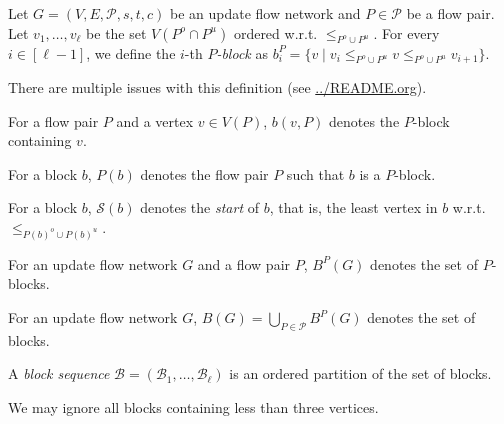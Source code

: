 \documentclass[fontsize=11pt,paper=a4]{book}
\begin{document}
\begin{defn}
Let \(G=(V,E,\mathcal{P},s,t,c)\) be an update flow network and \(P\in\mathcal{P}\) be a flow pair.
Let \(v_1,\dots,v_{\ell}\) be the set \(V(P^o\cap P^u)\) ordered w.r.t. \(\leq_{P^o\cup P^u}\).
For every \(i\in[\ell-1]\), we define the \(i\)-th \emph{\(P\)-block} as \(b_i^P=\{v\mid v_i\leq_{P^o\cup P^u}v\leq_{P^o\cup P^u}v_{i+1}\}\).
\label{org3e1b5bf}
\end{defn}

\begin{remark}
There are multiple issues with this definition (see \url{../README.org}).
\end{remark}

\begin{notation}
For a flow pair \(P\) and a vertex \(v\in V(P)\), \(b(v,P)\) denotes the \(P\)-block containing \(v\).
\label{org072524f}
\end{notation}

\begin{notation}
For a block \(b\), \(P(b)\) denotes the flow pair \(P\) such that \(b\) is a \(P\)-block.
\label{orgdcabd12}
\end{notation}

\begin{notation}
For a block \(b\), \(\mathcal{S}(b)\) denotes the \emph{start} of \(b\), that is, the least vertex in \(b\) w.r.t. \(\leq_{P(b)^o\cup P(b)^u}\).
\label{org51c0575}
\end{notation}

\begin{notation}
For an update flow network \(G\) and a flow pair \(P\), \(B^P(G)\) denotes the set of \(P\)-blocks.
\label{org3a72523}
\end{notation}

\begin{notation}
For an update flow network \(G\), \(B(G)=\bigcup_{P\in\mathcal{P}}B^P(G)\) denotes the set of blocks.
\label{orgaf5c11c}
\end{notation}

\begin{defn}
A \emph{block sequence} \(\mathcal{B}=(\mathscr{B}_1,\dots,\mathscr{B}_{\ell})\) is an ordered partition of the set of blocks.
\label{org237f83d}
\end{defn}

\begin{remark}
We may ignore all blocks containing less than three vertices.
\label{org7d3303c}
\end{remark}
\end{document}
